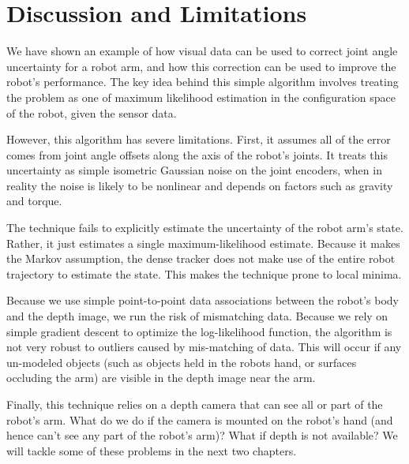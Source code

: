 \section{Discussion and Limitations}
We have shown an example of how visual data can be used to correct joint angle uncertainty for a robot arm, and how this correction can be used to improve the robot's performance. The key idea behind this simple algorithm involves treating the problem as one of maximum likelihood estimation in the configuration space of the robot, given the sensor data.

However, this algorithm has severe limitations. First, it assumes all of the error comes from joint angle offsets along the axis of the robot's joints. It treats this uncertainty as simple isometric Gaussian noise on the joint encoders, when in reality the noise is likely to be nonlinear and depends on factors such as gravity and torque. 

The technique fails to explicitly estimate the uncertainty of the robot arm's state. Rather, it just estimates a single maximum-likelihood estimate. Because it makes the Markov assumption, the dense tracker does not make use of the entire robot trajectory to estimate the state. This makes the technique prone to local minima.

Because we use simple point-to-point data associations between the robot's body and the depth image, we run the risk of mismatching data. Because we rely on simple gradient descent to optimize the log-likelihood function, the algorithm is not very robust to outliers caused by mis-matching of data. This will occur if any un-modeled objects (such as objects held in the robots hand, or surfaces occluding the arm) are visible in the depth image near the arm.

Finally, this technique relies on a depth camera that can see all or part of the robot's arm. What do we do if the camera is mounted on the robot's hand (and hence can't see any part of the robot's arm)? What if depth is not available? We will tackle some of these problems in the next two chapters.